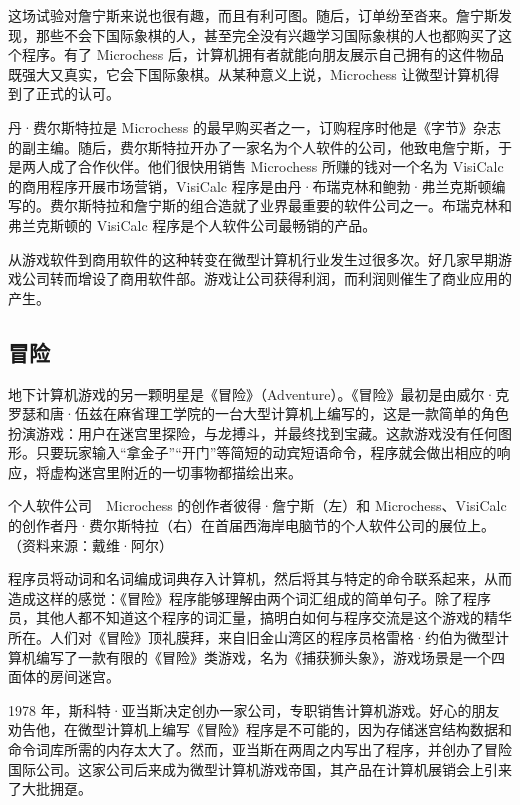 \documentclass[12pt,UTF8]{ctexbook}
\begin{document}
这场试验对詹宁斯来说也很有趣，而且有利可图。随后，订单纷至沓来。詹宁斯发现，那些不会下国际象棋的人，甚至完全没有兴趣学习国际象棋的人也都购买了这个程序。有了 Microchess 后，计算机拥有者就能向朋友展示自己拥有的这件物品既强大又真实，它会下国际象棋。从某种意义上说，Microchess 让微型计算机得到了正式的认可。

丹·费尔斯特拉是 Microchess 的最早购买者之一，订购程序时他是《字节》杂志的副主编。随后，费尔斯特拉开办了一家名为个人软件的公司，他致电詹宁斯，于是两人成了合作伙伴。他们很快用销售 Microchess 所赚的钱对一个名为 VisiCalc 的商用程序开展市场营销，VisiCalc 程序是由丹·布瑞克林和鲍勃·弗兰克斯顿编写的。费尔斯特拉和詹宁斯的组合造就了业界最重要的软件公司之一。布瑞克林和弗兰克斯顿的 VisiCalc 程序是个人软件公司最畅销的产品。

从游戏软件到商用软件的这种转变在微型计算机行业发生过很多次。好几家早期游戏公司转而增设了商用软件部。游戏让公司获得利润，而利润则催生了商业应用的产生。





\subsection{冒险}


地下计算机游戏的另一颗明星是《冒险》（Adventure）。《冒险》最初是由威尔·克罗瑟和唐·伍兹在麻省理工学院的一台大型计算机上编写的，这是一款简单的角色扮演游戏：用户在迷宫里探险，与龙搏斗，并最终找到宝藏。这款游戏没有任何图形。只要玩家输入“拿金子”“开门”等简短的动宾短语命令，程序就会做出相应的响应，将虚构迷宫里附近的一切事物都描绘出来。



个人软件公司　Microchess 的创作者彼得·詹宁斯（左）和 Microchess、VisiCalc 的创作者丹·费尔斯特拉（右）在首届西海岸电脑节的个人软件公司的展位上。（资料来源：戴维·阿尔）

程序员将动词和名词编成词典存入计算机，然后将其与特定的命令联系起来，从而造成这样的感觉：《冒险》程序能够理解由两个词汇组成的简单句子。除了程序员，其他人都不知道这个程序的词汇量，搞明白如何与程序交流是这个游戏的精华所在。人们对《冒险》顶礼膜拜，来自旧金山湾区的程序员格雷格·约伯为微型计算机编写了一款有限的《冒险》类游戏，名为《捕获狮头象》，游戏场景是一个四面体的房间迷宫。

1978 年，斯科特·亚当斯决定创办一家公司，专职销售计算机游戏。好心的朋友劝告他，在微型计算机上编写《冒险》程序是不可能的，因为存储迷宫结构数据和命令词库所需的内存太大了。然而，亚当斯在两周之内写出了程序，并创办了冒险国际公司。这家公司后来成为微型计算机游戏帝国，其产品在计算机展销会上引来了大批拥趸。
\end{document}
